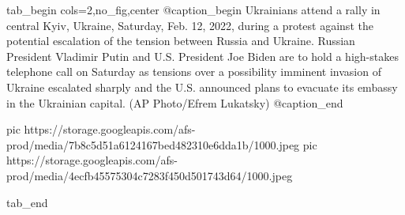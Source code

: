  
 
 
 
 

\ifcmt
  tab_begin cols=2,no_fig,center
     @caption_begin
Ukrainians attend a rally in central Kyiv, Ukraine, Saturday, Feb. 12, 2022,
during a protest against the potential escalation of the tension between Russia
and Ukraine. Russian President Vladimir Putin and U.S. President Joe Biden are
to hold a high-stakes telephone call on Saturday as tensions over a possibility
imminent invasion of Ukraine escalated sharply and the U.S. announced plans to
evacuate its embassy in the Ukrainian capital. (AP Photo/Efrem Lukatsky)
     @caption_end

     pic https://storage.googleapis.com/afs-prod/media/7b8c5d51a6124167bed482310e6dda1b/1000.jpeg
     pic https://storage.googleapis.com/afs-prod/media/4ecfb45575304c7283f450d501743d64/1000.jpeg

  tab_end
\fi
